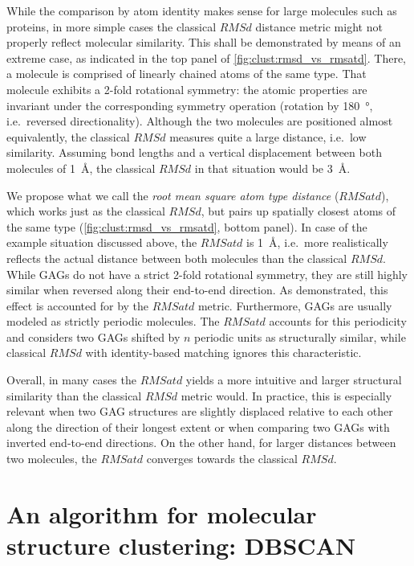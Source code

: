 While the comparison by atom identity makes sense for large molecules such as
proteins, in more simple cases the classical $RMSd$ distance metric might not
properly reflect molecular similarity. This shall be demonstrated by means of an
extreme case, as indicated in the top panel of
\cref{fig:clust:rmsd_vs_rmsatd}. There, a molecule is comprised of linearly
chained atoms of the same type. That molecule exhibits a 2-fold rotational
symmetry: the atomic properties are invariant under the corresponding symmetry
operation (rotation by \SI{180}{\degree}, i.e.\ reversed directionality).
Although the two molecules are positioned almost equivalently, the classical
$RMSd$ measures quite a large distance, i.e.\ low similarity. Assuming bond
lengths and a vertical displacement between both molecules of \SI{1}{\angstrom},
the classical $RMSd$ in that situation would be \SI{3}{\angstrom}.

We propose what we call the \textit{root mean square atom type distance}
($RMSatd$), which works just as the classical $RMSd$, but pairs up spatially
closest atoms of the same type (\cref{fig:clust:rmsd_vs_rmsatd}, bottom panel).
In case of the example situation discussed above, the $RMSatd$ is
\SI{1}{\angstrom}, i.e.\ more realistically reflects the actual distance between
both molecules than the classical $RMSd$. While GAGs do not have a strict 2-fold
rotational symmetry, they are still highly similar when reversed along
their end-to-end direction. As demonstrated, this effect is accounted for by the
$RMSatd$ metric. Furthermore, GAGs are usually modeled as strictly periodic
molecules. The $RMSatd$ accounts for this periodicity and considers two GAGs
shifted by $n$ periodic units as structurally similar, while classical $RMSd$
with identity-based matching ignores this characteristic.

Overall, in many cases the $RMSatd$ yields a more intuitive and larger
structural similarity than the classical $RMSd$ metric would. In practice, this
is especially relevant when two GAG structures are slightly displaced relative
to each other along the direction of their longest extent or when comparing two
GAGs with inverted end-to-end directions. On the other hand, for larger
distances between two molecules, the $RMSatd$ converges towards the classical
$RMSd$.


\section{An algorithm for molecular structure clustering: DBSCAN}

